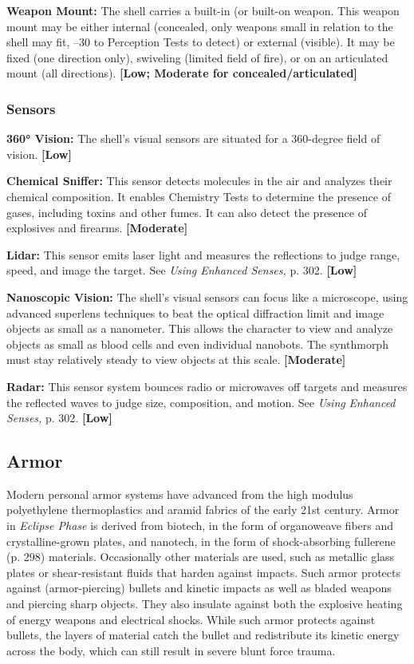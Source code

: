 \textbf{Weapon Mount:} The shell carries a built-in (or built-on
weapon. This weapon mount may be either internal
(concealed, only weapons small in relation to the shell 
may fit, –30 to Perception Tests to detect) or external 
(visible). It may be fixed (one direction only), swiveling 
(limited field of fire), or on an articulated mount (all 
directions). \textbf{[Low; Moderate for concealed/articulated]}

\subsubsection{Sensors}

\textbf{360° Vision: }The shell's visual sensors are situated for 
a 360-degree field of vision. \textbf{[Low]}

\textbf{Chemical Sniffer:} This sensor detects molecules in the 
air and analyzes their chemical composition. It enables 
Chemistry Tests to determine the presence of gases, including
toxins and other fumes. It can also detect the
presence of explosives and firearms. \textbf{[Moderate]}

\textbf{Lidar:} This sensor emits laser light and measures 
the reflections to judge range, speed, and image the 
target. See \textit{Using Enhanced Senses,} p. 302. \textbf{[Low]}

\textbf{Nanoscopic Vision:} The shell's visual sensors can 
focus like a microscope, using advanced superlens 
techniques to beat the optical diffraction limit and 
image objects as small as a nanometer. This allows 
the character to view and analyze objects as small as 
blood cells and even individual nanobots. The synthmorph
must stay relatively steady to view objects at
this scale. \textbf{[Moderate]}

\textbf{Radar:} This sensor system bounces radio or microwaves
off targets and measures the reflected waves
to judge size, composition, and motion. See \textit{Using }
\textit{Enhanced Senses,} p. 302. \textbf{[Low]}

\subsection{Armor}

Modern personal armor systems have advanced from 
the high modulus polyethylene thermoplastics and 
aramid fabrics of the early 21st century. Armor in 
\textit{Eclipse Phase} is derived from biotech, in the form of 
organoweave fibers and crystalline-grown plates, and 
nanotech, in the form of shock-absorbing fullerene (p. 
298) materials. Occasionally other materials are used, 
such as metallic glass plates or shear-resistant fluids 
that harden against impacts. Such armor protects 
against (armor-piercing) bullets and kinetic impacts 
as well as bladed weapons and piercing sharp objects. 
They also insulate against both the explosive heating 
of energy weapons and electrical shocks. While such 
armor protects against bullets, the layers of material
catch the bullet and redistribute its kinetic energy
across the body, which can still result in severe blunt 
force trauma.

